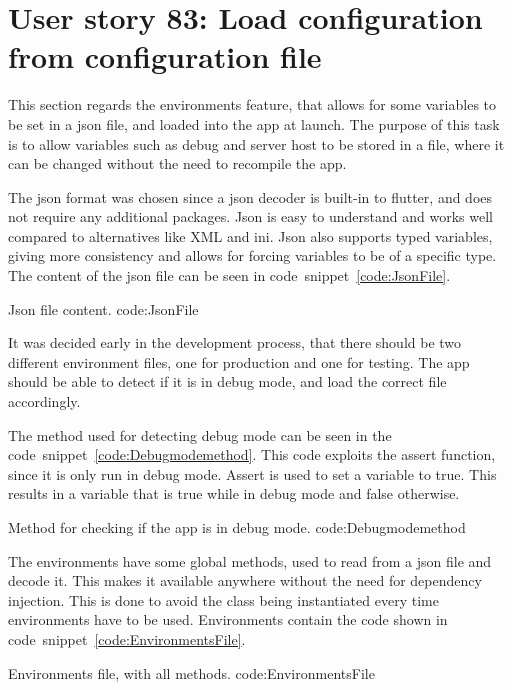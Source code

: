  \section{User story 83: Load configuration from configuration file}
\label{sect:Environments}
This section regards the environments feature, that allows for some variables to be set in a json file, and loaded into the app at launch. The purpose of this task is to allow variables such as debug and server host to be stored in a file, where it can be changed without the need to recompile the app. 

The json format was chosen since a json decoder is built-in to flutter, and does not require any additional packages. Json is easy to understand and works well compared to alternatives like XML and ini. Json also supports typed variables, giving more consistency and allows for forcing variables to be of a specific type. The content of the json file can be seen in code~snippet~\ref{code:JsonFile}.

        {Json file content.} %
        {code:JsonFile} %

It was decided early in the development process, that there should be two different environment files, one for production and one for testing. The app should be able to detect if it is in debug mode, and load the correct file accordingly.

The method used for detecting debug mode can be seen in the code~snippet~\ref{code:Debugmodemethod}. This code exploits the assert function, since it is only run in debug mode. Assert is used to set a variable to true. This results in a variable that is true while in debug mode and false otherwise.

        {Method for checking if the app is in debug mode.} %
        {code:Debugmodemethod} %

The environments have some global methods, used to read from a json file and decode it. This makes it available anywhere without the need for dependency injection. This is done to avoid the class being instantiated every time environments have to be used. Environments contain the code shown in code~snippet~\ref{code:EnvironmentsFile}.

        {Environments file, with all methods.} %
        {code:EnvironmentsFile} %